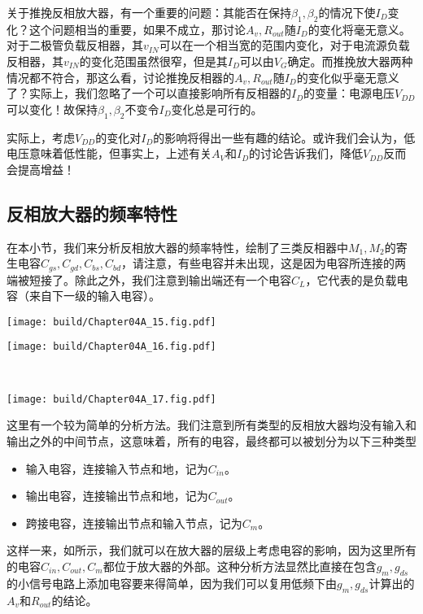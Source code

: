 关于推挽反相放大器，有一个重要的问题：其能否在保持$\beta_1,\beta_2$的情况下使$I_D$变化？这个问题相当的重要，如果不成立，那讨论$A_v,R_{out}$随$I_D$的变化将毫无意义。对于二极管负载反相器，其$v_{IN}$可以在一个相当宽的范围内变化，对于电流源负载反相器，其$v_{IN}$的变化范围虽然很窄，但是其$I_D$可以由$V_G$确定。而推挽放大器两种情况都不符合，那这么看，讨论推挽反相器的$A_v,R_{out}$随$I_D$的变化似乎毫无意义了？实际上，我们忽略了一个可以直接影响所有反相器的$I_D$的变量：电源电压$V_{DD}$可以变化！故保持$\beta_1,\beta_2$不变令$I_D$变化总是可行的。

实际上，考虑$V_{DD}$的变化对$I_D$的影响将得出一些有趣的结论。或许我们会认为，低电压意味着低性能，但事实上，上述有关$A_V$和$I_D$的讨论告诉我们，降低$V_{DD}$反而会提高增益！

\subsection{反相放大器的频率特性}

在本小节，我们来分析反相放大器的频率特性，绘制了三类反相器中$M_1,M_2$的寄生电容$C_{gs},C_{gd},C_{bs},C_{bd}$，请注意，有些电容并未出现，这是因为电容所连接的两端被短接了。除此之外，我们注意到输出端还有一个电容$C_L$，它代表的是负载电容（来自下一级的输入电容）。
\begin{Figure}[反相放大器的电容]
    \begin{FigureSub}[二极管负载反相放大器的电容]
        \texttt{[image: build/Chapter04A\_15.fig.pdf]}
    \end{FigureSub}\qquad
    \begin{FigureSub}[电流源负载反相放大器的电容]
        \texttt{[image: build/Chapter04A\_16.fig.pdf]}
    \end{FigureSub}\\ \vspace{0.25cm}
    \begin{FigureSub}[推挽反相放大器的电容]
        \texttt{[image: build/Chapter04A\_17.fig.pdf]}
    \end{FigureSub}
\end{Figure}

这里有一个较为简单的分析方法。我们注意到所有类型的反相放大器均没有输入和输出之外的中间节点，这意味着，所有的电容，最终都可以被划分为以下三种类型
\begin{itemize}
    \item 输入电容，连接输入节点和地，记为$C_{in}$。
    \item 输出电容，连接输出节点和地，记为$C_{out}$。
    \item 跨接电容，连接输出节点和输入节点，记为$C_m$。
\end{itemize}
这样一来，如所示，我们就可以在放大器的层级上考虑电容的影响，因为这里所有的电容$C_{in},C_{out},C_{m}$都位于放大器的外部。这种分析方法显然比直接在包含$g_{m},g_{ds}$的小信号电路上添加电容要来得简单，因为我们可以复用低频下由$g_{m},g_{ds}$计算出的$A_v$和$R_{out}$的结论。


